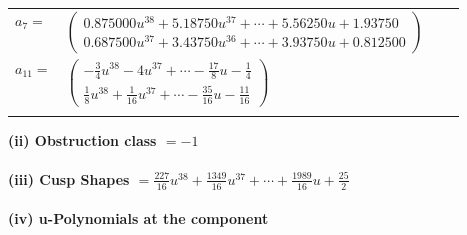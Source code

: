 \documentclass[1p]{elsarticle_modified}
\theoremstyle{definition}
\begin{document}
\begin{tabular}{m{7pt} m{180pt} m{7pt} m{180pt} }
\flushright $a_{7}=$&$\begin{pmatrix}0.875000 u^{38}+5.18750 u^{37}+\cdots+5.56250 u+1.93750\\0.687500 u^{37}+3.43750 u^{36}+\cdots+3.93750 u+0.812500\end{pmatrix}$ \\
\flushright $a_{11}=$&$\begin{pmatrix}-\frac{3}{4} u^{38}-4 u^{37}+\cdots-\frac{17}{8} u-\frac{1}{4}\\\frac{1}{8} u^{38}+\frac{1}{16} u^{37}+\cdots-\frac{35}{16} u-\frac{11}{16}\end{pmatrix}$\\&\end{tabular}
\flushleft \textbf{(ii) Obstruction class $= -1$}\\~\\
\flushleft \textbf{(iii) Cusp Shapes $= \frac{227}{16} u^{38}+\frac{1349}{16} u^{37}+\cdots+\frac{1989}{16} u+\frac{25}{2}$}\\~\\
\newpage\renewcommand{\arraystretch}{1}
\flushleft \textbf{(iv) u-Polynomials at the component}\newline \\
\end{document}
